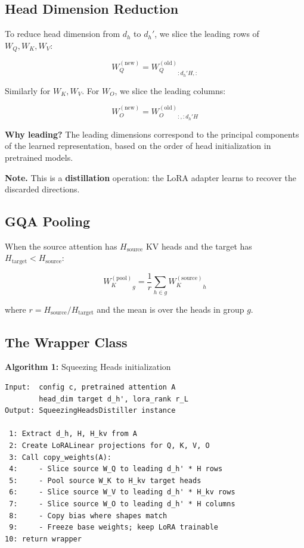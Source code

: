 \subsection{Head Dimension Reduction}

To reduce head dimension from $d_h$ to $d_h'$, we slice the leading rows 
of $W_Q, W_K, W_V$:

\[
W_Q^{(\text{new})} = {W_Q^{(\text{old})}}_{:d_h' H, :}
\]

Similarly for $W_K, W_V$. For $W_O$, we slice the leading columns:

\[
W_O^{(\text{new})} = {W_O^{(\text{old})}}_{:, :d_h' H}
\]

\textbf{Why leading?} The leading dimensions correspond to the principal 
components of the learned representation, based on the order of head 
initialization in pretrained models.

\textbf{Note.} This is a \textbf{distillation} operation: the LoRA adapter learns to 
recover the discarded directions.

\subsection{GQA Pooling}

When the source attention has $H_\text{source}$ KV heads and the target has 
$H_\text{target} < H_\text{source}$:

\[
{W_K^{(\text{pool})}}_g = \frac{1}{r} \sum_{h \in g} {W_K^{(\text{source})}}_h
\]

where $r = H_\text{source} / H_\text{target}$ and the mean is over the 
heads in group $g$.

\subsection{The Wrapper Class}

\textbf{Algorithm 1:} Squeezing Heads initialization
\begin{lstlisting}
Input:  config c, pretrained attention A
        head_dim target d_h', lora_rank r_L
Output: SqueezingHeadsDistiller instance

 1: Extract d_h, H, H_kv from A
 2: Create LoRALinear projections for Q, K, V, O
 3: Call copy_weights(A):
 4:     - Slice source W_Q to leading d_h' * H rows
 5:     - Pool source W_K to H_kv target heads
 6:     - Slice source W_V to leading d_h' * H_kv rows
 7:     - Slice source W_O to leading d_h' * H columns
 8:     - Copy bias where shapes match
 9:     - Freeze base weights; keep LoRA trainable
10: return wrapper
\end{lstlisting}

